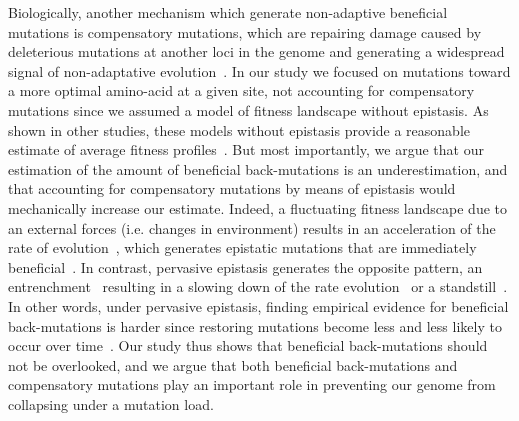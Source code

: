 \documentclass{article}
\begin{document}
    Biologically, another mechanism which generate non-adaptive beneficial mutations is compensatory mutations, which are repairing damage caused by deleterious mutations at another loci in the genome and generating a widespread signal of non-adaptative evolution~\cite{hartl_compensatory_1996, pollock_strong_2014, starr_epistasis_2016}.
    In our study we focused on mutations toward a more optimal amino-acid at a given site, not accounting for compensatory mutations since we assumed a model of fitness landscape without epistasis.
    As shown in other studies, these models without epistasis provide a reasonable estimate of average fitness profiles~\cite{youssef_consequences_2020}.
    But most importantly, we argue that our estimation of the amount of beneficial back-mutations is an underestimation, and that accounting for compensatory mutations by means of epistasis would mechanically increase our estimate.
    Indeed, a fluctuating fitness landscape due to an external forces (i.e. changes in environment) results in an acceleration of the rate of evolution~\cite{ rodrigue_detecting_2017, rodrigue_bayesian_2021}, which generates epistatic mutations that are immediately beneficial~\cite{gong_epistatically_2014}.
    In contrast, pervasive epistasis generates the opposite pattern, an entrenchment~\cite{goldstein_evolutionary_2004, goldstein_nonadaptive_2015} resulting in a slowing down of the rate evolution~\cite{rodrigue_detecting_2017, patel_epistasis_2022} or a standstill~\cite{youssef_evolution_2022}.
    In other words, under pervasive epistasis, finding empirical evidence for beneficial back-mutations is harder since restoring mutations become less and less likely to occur over time~\cite{goldstein_nonadaptive_2015, goldstein_sequence_2017, park_epistatic_2022}.
    Our study thus shows that beneficial back-mutations should not be overlooked, and we argue that both beneficial back-mutations and compensatory mutations play an important role in preventing our genome from collapsing under a mutation load.
\end{document}
